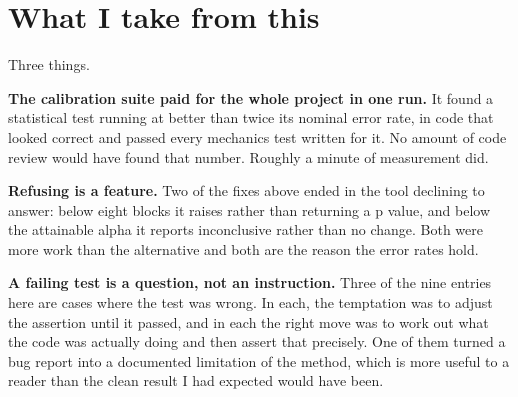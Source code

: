 \documentclass[11pt,a4paper]{article}
\begin{document}
\section{What I take from this}

Three things.

\textbf{The calibration suite paid for the whole project in one run.} It found a
statistical test running at better than twice its nominal error rate, in code
that looked correct and passed every mechanics test written for it. No amount of
code review would have found that number. Roughly a minute of measurement did.

\textbf{Refusing is a feature.} Two of the fixes above ended in the tool
declining to answer: below eight blocks it raises rather than returning a p
value, and below the attainable alpha it reports inconclusive rather than no
change. Both were more work than the alternative and both are the reason the
error rates hold.

\textbf{A failing test is a question, not an instruction.} Three of the nine
entries here are cases where the test was wrong. In each, the temptation was to
adjust the assertion until it passed, and in each the right move was to work out
what the code was actually doing and then assert that precisely. One of them
turned a bug report into a documented limitation of the method, which is more
useful to a reader than the clean result I had expected would have been.
\end{document}
